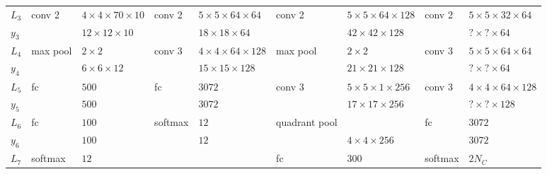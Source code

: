 \begin{landscape}
\begin{table}[h!]
{\begin{tabular}{|lllllllll|}
    \multicolumn{1}{|l|}{$L_3$}   & conv 2   & \multicolumn{1}{l|}{$4\times 4\times70\times 10$}  & conv 2   & \multicolumn{1}{l|}{$5 \times 5 \times 64\times64$}  & conv 2        & \multicolumn{1}{l|}{$5\times5\times64\times128$} & conv 2    & $5\times5\times32\times64$     \\
    \multicolumn{1}{|l|}{$y_3$}   &          & \multicolumn{1}{l|}{$12\times 12 \times 10$}       &          & \multicolumn{1}{l|}{$18 \times 18\times64$}          &               & \multicolumn{1}{l|}{$42\times42\times128$}       &           & $?\times?\times64$             \\ \hline
    \multicolumn{1}{|l|}{$L_4$}   & max pool & \multicolumn{1}{l|}{$2\times 2$}                   & conv 3   & \multicolumn{1}{l|}{$4\times 4 \times64 \times 128$} & max pool      & \multicolumn{1}{l|}{$2\times2$}                  & conv 3    & $5\times5\times64\times64$     \\
    \multicolumn{1}{|l|}{$y_4$}   &          & \multicolumn{1}{l|}{$6\times 6 \times 12$}         &          & \multicolumn{1}{l|}{$15\times15\times128$}           &               & \multicolumn{1}{l|}{$21\times21\times128$}       &           & $?\times?\times64$             \\ \hline
    \multicolumn{1}{|l|}{$L_5$}   & fc       & \multicolumn{1}{l|}{$500$}                         & fc       & \multicolumn{1}{l|}{$3072$}                          & conv 3        & \multicolumn{1}{l|}{$5\times5\times1\times256$}  & conv 3    & $4\times4\times64\times128$    \\
    \multicolumn{1}{|l|}{$y_5$}   &          & \multicolumn{1}{l|}{$500$}                         &          & \multicolumn{1}{l|}{$3072$}                          &               & \multicolumn{1}{l|}{$17\times17\times256$}       &           & $?\times?\times128$            \\ \hline
    \multicolumn{1}{|l|}{$L_6$}   & fc       & \multicolumn{1}{l|}{$100$}                         & softmax  & \multicolumn{1}{l|}{$12$}                            & quadrant pool & \multicolumn{1}{l|}{}                            & fc        & $3072$                         \\
    \multicolumn{1}{|l|}{$y_6$}   &          & \multicolumn{1}{l|}{$100$}                         &          & \multicolumn{1}{l|}{$12$}                            &               & \multicolumn{1}{l|}{$4\times4\times256$}         &           & $3072$                         \\ \hline
    \multicolumn{1}{|l|}{$L_7$}   & softmax  & \multicolumn{1}{l|}{$12$}                          &          & \multicolumn{1}{l|}{}                                & fc            & \multicolumn{1}{l|}{$300$}                       & softmax   & $2N_{C}$                       \\

\end{tabular}}
\end{table}
\end{landscape}
